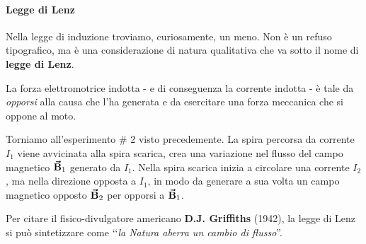 \paragraph{Legge di Lenz}
Nella legge di induzione troviamo, curiosamente, un meno. Non è un refuso tipografico, ma è una considerazione di natura qualitativa che va sotto il nome di \textbf{legge di Lenz}.
\begin{corollaryqed}
	La forza elettromotrice indotta - e di conseguenza la corrente indotta - è tale da \textit{opporsi} alla causa che l'ha generata e da esercitare una forza meccanica che si oppone al moto. 
\end{corollaryqed}
\begin{observe}
	Torniamo all'esperimento \# 2 visto precedemente. La spira percorsa da corrente $I_1$ viene avvicinata alla spira scarica, crea una variazione nel flusso del campo magnetico $\vb*{\va{B}}_1$ generato da $I_1$. Nella spira scarica inizia a circolare una corrente $I_2$, ma nella direzione opposta a $I_1$, in modo da generare a sua volta un campo magnetico opposto $\vb*{\va{B}}_2$ per opporsi a $\vb*{\va{B}}_1$.  
\end{observe}
Per citare il fisico-divulgatore americano \textbf{D.J. Griffiths} (1942), la legge di Lenz si può sintetizzare come ‘‘\textit{la Natura aberra un cambio di flusso}''.
